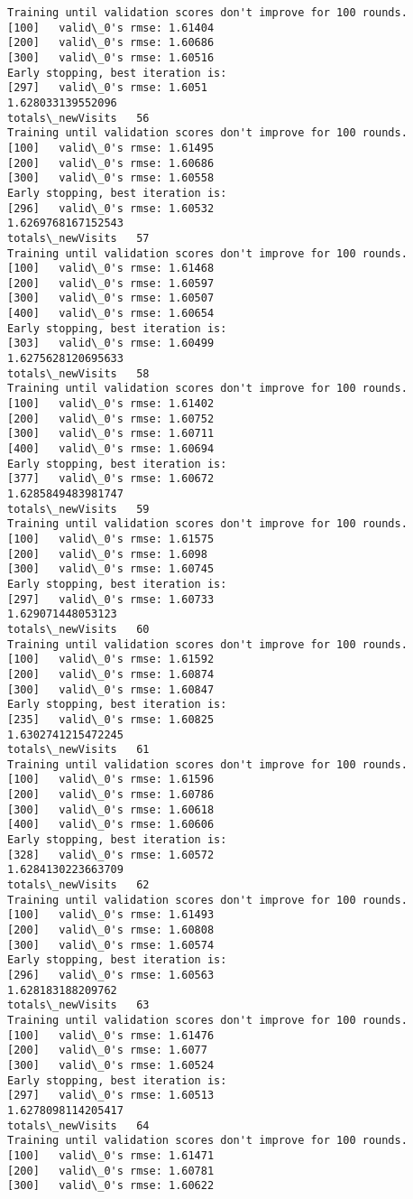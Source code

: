 \documentclass[11pt]{article}
\begin{document}
\begin{Verbatim}[commandchars=\\\{\}]
Training until validation scores don't improve for 100 rounds.
[100]	valid\_0's rmse: 1.61404
[200]	valid\_0's rmse: 1.60686
[300]	valid\_0's rmse: 1.60516
Early stopping, best iteration is:
[297]	valid\_0's rmse: 1.6051
1.628033139552096
totals\_newVisits   56
Training until validation scores don't improve for 100 rounds.
[100]	valid\_0's rmse: 1.61495
[200]	valid\_0's rmse: 1.60686
[300]	valid\_0's rmse: 1.60558
Early stopping, best iteration is:
[296]	valid\_0's rmse: 1.60532
1.6269768167152543
totals\_newVisits   57
Training until validation scores don't improve for 100 rounds.
[100]	valid\_0's rmse: 1.61468
[200]	valid\_0's rmse: 1.60597
[300]	valid\_0's rmse: 1.60507
[400]	valid\_0's rmse: 1.60654
Early stopping, best iteration is:
[303]	valid\_0's rmse: 1.60499
1.6275628120695633
totals\_newVisits   58
Training until validation scores don't improve for 100 rounds.
[100]	valid\_0's rmse: 1.61402
[200]	valid\_0's rmse: 1.60752
[300]	valid\_0's rmse: 1.60711
[400]	valid\_0's rmse: 1.60694
Early stopping, best iteration is:
[377]	valid\_0's rmse: 1.60672
1.6285849483981747
totals\_newVisits   59
Training until validation scores don't improve for 100 rounds.
[100]	valid\_0's rmse: 1.61575
[200]	valid\_0's rmse: 1.6098
[300]	valid\_0's rmse: 1.60745
Early stopping, best iteration is:
[297]	valid\_0's rmse: 1.60733
1.629071448053123
totals\_newVisits   60
Training until validation scores don't improve for 100 rounds.
[100]	valid\_0's rmse: 1.61592
[200]	valid\_0's rmse: 1.60874
[300]	valid\_0's rmse: 1.60847
Early stopping, best iteration is:
[235]	valid\_0's rmse: 1.60825
1.6302741215472245
totals\_newVisits   61
Training until validation scores don't improve for 100 rounds.
[100]	valid\_0's rmse: 1.61596
[200]	valid\_0's rmse: 1.60786
[300]	valid\_0's rmse: 1.60618
[400]	valid\_0's rmse: 1.60606
Early stopping, best iteration is:
[328]	valid\_0's rmse: 1.60572
1.6284130223663709
totals\_newVisits   62
Training until validation scores don't improve for 100 rounds.
[100]	valid\_0's rmse: 1.61493
[200]	valid\_0's rmse: 1.60808
[300]	valid\_0's rmse: 1.60574
Early stopping, best iteration is:
[296]	valid\_0's rmse: 1.60563
1.628183188209762
totals\_newVisits   63
Training until validation scores don't improve for 100 rounds.
[100]	valid\_0's rmse: 1.61476
[200]	valid\_0's rmse: 1.6077
[300]	valid\_0's rmse: 1.60524
Early stopping, best iteration is:
[297]	valid\_0's rmse: 1.60513
1.6278098114205417
totals\_newVisits   64
Training until validation scores don't improve for 100 rounds.
[100]	valid\_0's rmse: 1.61471
[200]	valid\_0's rmse: 1.60781
[300]	valid\_0's rmse: 1.60622

\end{Verbatim}
\end{document}

